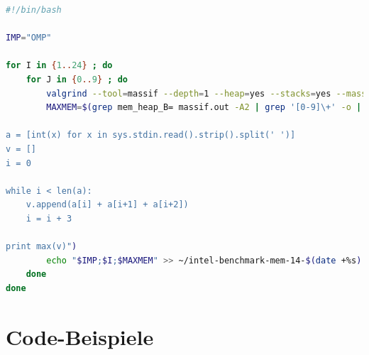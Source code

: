 \documentclass[11pt]{scrartcl}
\begin{document}
\begin{lstlisting}[language=Bash,caption=Bash-Skript zur Erfassung des Speicherverbrauchs]
#!/bin/bash

IMP="OMP"

for I in {1..24} ; do
	for J in {0..9} ; do
		valgrind --tool=massif --depth=1 --heap=yes --stacks=yes --massif-out-file=massif.out ../../run -nb_threads $I -from BOSTON -to MUNICH -departure_time_min 04102012000000 -departure_time_max 04142012000000 -arrival_time_min 05102012000000 -arrival_time_max 05142012000000 -max_layover 10000 -vacation_time_min 500000 -vacation_time_max 700000 -flights flights.txt -alliances alliances.txt -work_hard_file work_hard..txt -play_hard_file play_hard..txt -vacation_airports ATLANTA LONDON\ HEATHROW PHILADELPHIA RIO\ DE\ JANEIRO TORONTO
		MAXMEM=$(grep mem_heap_B= massif.out -A2 | grep '[0-9]\+' -o | tr "\n" " " | python -c "import sys

a = [int(x) for x in sys.stdin.read().strip().split(' ')]
v = []
i = 0

while i < len(a):
	v.append(a[i] + a[i+1] + a[i+2])
	i = i + 3

print max(v)")
		echo "$IMP;$I;$MAXMEM" >> ~/intel-benchmark-mem-14-$(date +%s).csv
	done
done
\end{lstlisting}

	

\pagebreak
\section{Code-Beispiele}

\subsection{}




\end{document}
